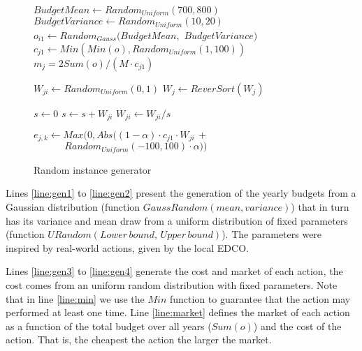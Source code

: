\begin{figure}
\begin{algorithm}[H]
\begin{algorithmic}[1]
\State \label{line:gen1} $BudgetMean \gets Random_{\textit{Uniform}}(700,800)$
\State $BudgetVariance \gets Random_{\textit{Uniform}}(10,20)$
  \State $o_{i1} \gets Random_{\textit{Gauss}}(BudgetMean,$ $BudgetVariance)$
\EndFor \label{line:gen2}
\label{line:gen3}
  \State $c_{j1} \gets \label{line:min} Min(Min(o), Random_{\textit{Uniform}}(1,100))$
\EndFor
{}
  \State \label{line:market} $ m_j = 2 Sum(o) / (M \cdot c_{j1})$
\EndFor \label{line:gen4}

 \label{line:W1}
    \State $W_{ji} \gets Random_{\textit{Uniform}}(0,1)$
  \EndFor
  \State $W_{j} \gets ReverSort(W_{j})$
\EndFor

  \State $s \gets 0$
    \State $s \gets s + W_{ji}$
  \EndFor
    \State $W_{ji} \gets W_{ji}/s$
  \EndFor
\EndFor  \label{line:W2}

 \label{line:e1}
      \State \label{line:en} $e_{j,k} \gets Max(0, Abs((1-\alpha) \cdot c_{j1} \cdot W_{ji} \, +$
      \State $\qquad \quad \, Random_{\textit{Uniform}}(-100,100) \cdot \alpha))$
  \EndFor
\EndFor \label{line:e2}
\EndFunction
\end{algorithmic}
\caption{Random instance generator}
\label{alg:gen}
\end{algorithm}
\end{figure}

Lines \ref{line:gen1} to \ref{line:gen2} present the generation of the yearly budgets from a Gaussian
distribution (function $GaussRandom(mean, variance)$) that in turn has its variance and mean draw 
from a uniform distribution of fixed parameters (function $URandom(Lower\,bound,\,Upper\,bound)$).
The parameters were inspired by real-world actions, given by the local EDCO.

Lines \ref{line:gen3} to \ref{line:gen4} generate the cost and market of each action, the cost comes from
an uniform random distribution with fixed parameters. Note that in line \ref{line:min} we
use the $Min$ function to guarantee that the action may performed at least one time. Line \ref{line:market}
defines the market of each action as a function of the total budget over all years ($Sum(o)$) and the
cost of the action. That is, the cheapest the action the larger the market.

